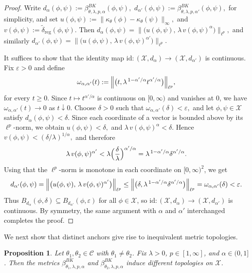 \documentclass[11pt]{amsart}
\newtheorem{proposition}[theorem]{Proposition}
\theoremstyle{definition}
\theoremstyle{remark}
\newcommand{\1}{\mathbbm{1}}
\begin{document}
\begin{proof}
Write $d_\alpha(\phi,\psi):=\beta^{BK}_{\theta,\lambda,p,\alpha}(\phi,\psi),$
$d_{\alpha'}(\phi,\psi):=\beta^{BK}_{\theta,\lambda,p,\alpha'}(\phi,\psi),$ for simplicity, 
and set $u(\phi,\psi):=\|\kappa_\theta(\phi)-\kappa_\theta(\psi)\|_\infty,$ and
$v(\phi,\psi):=\widetilde\delta_{\mathrm{reg}}(\phi,\psi).$
Then $d_\alpha(\phi,\psi)=
\bigl\|\bigl(u(\phi,\psi),\,\lambda\,v(\phi,\psi)^\alpha\bigr)\bigr\|_{\ell^p},$ and similarly $d_{\alpha'}(\phi,\psi)=
\bigl\|\bigl(u(\phi,\psi),\,\lambda\,v(\phi,\psi)^{\alpha'}\bigr)\bigr\|_{\ell^p}.$

It suffices to show that the identity map $\mathrm{id}:(\mathcal X,d_\alpha)\to (\mathcal X,d_{\alpha'})$
is continuous.
Fix $\varepsilon>0$ and define \[\omega_{\alpha,\alpha'}(t):=
\Bigl\|\bigl(t,\lambda^{\,1-\alpha'/\alpha}t^{\alpha'/\alpha}\bigr)\Bigr\|_{\ell^p},\] for every $ t\ge 0.$
Since $t\mapsto t^{\alpha'/\alpha}$ is continuous on $[0,\infty)$ and vanishes at $0$,
we have $\omega_{\alpha,\alpha'}(t)\to 0$
as $t\downarrow 0$.
Choose $\delta>0$ such that $\omega_{\alpha,\alpha'}(\delta)<\varepsilon,$ and let $\phi,\psi\in\mathcal X$ satisfy $d_\alpha(\phi,\psi)<\delta$.
Since each coordinate of a vector is bounded above by its $\ell^p$-norm, we obtain $u(\phi,\psi)<\delta,$ and $\lambda\,v(\phi,\psi)^\alpha<\delta.$
Hence $v(\phi,\psi)<(\delta/\lambda)^{1/\alpha},$
and therefore
\[
\lambda\,v(\phi,\psi)^{\alpha'}
<
\lambda\Bigl(\frac{\delta}{\lambda}\Bigr)^{\alpha'/\alpha}
=
\lambda^{\,1-\alpha'/\alpha}\delta^{\alpha'/\alpha}.
\]
Using that the $\ell^p$-norm is monotone in each coordinate on $[0,\infty)^2$, we get
\[
d_{\alpha'}(\phi,\psi)
=
\Bigl\|\bigl(u(\phi,\psi),\,\lambda\,v(\phi,\psi)^{\alpha'}\bigr)\Bigr\|_{\ell^p}
\le
\Bigl\|\bigl(\delta,\lambda^{\,1-\alpha'/\alpha}\delta^{\alpha'/\alpha}\bigr)\Bigr\|_{\ell^p}
=
\omega_{\alpha,\alpha'}(\delta)
<
\varepsilon.
\]
Thus $B_{d_\alpha}(\phi,\delta)\subseteq B_{d_{\alpha'}}(\phi,\varepsilon)$ for all $\phi\in\mathcal X$,
so $\mathrm{id}:(\mathcal X,d_\alpha)\to(\mathcal X,d_{\alpha'})$ is continuous. By symmetry, the same argument with $\alpha$ and $\alpha'$ interchanged completes the proof.
\end{proof}
We next show that distinct anchors give rise to inequivalent metric topologies.
\begin{proposition}\label{prop:anchors-nonequiv}
Let $\theta_1,\theta_2\in \mathcal C$ with $\theta_1\neq \theta_2$. Fix $\lambda>0$, $p\in[1,\infty]$, and $\alpha\in(0,1]$.
Then the metrics $\beta^{BK}_{\theta_1,\lambda,p,\alpha}$ and $\beta^{BK}_{\theta_2,\lambda,p,\alpha}$ induce different topologies on $\mathcal X$.
\end{proposition}
\end{document}
